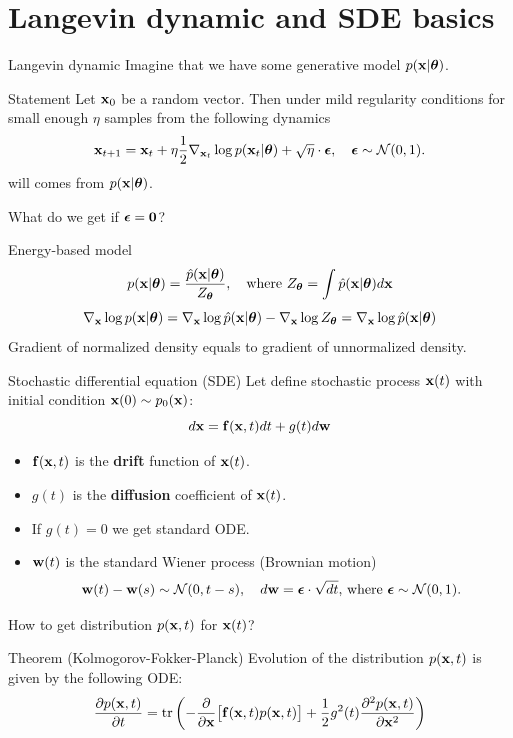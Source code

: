 \section{Langevin dynamic and SDE basics}
\begin{frame}{Langevin dynamic}
	Imagine that we have some generative model $p(\mathbf{x} | \boldsymbol{\theta})$.
	\begin{block}{Statement}
		Let $\mathbf{x}_0$ be a random vector. Then under mild regularity conditions for small enough $\eta$ samples from the following dynamics
		\[
			\mathbf{x}_{t + 1} = \mathbf{x}_t + \eta \frac{1}{2} \nabla_{\mathbf{x}_t} \log p(\mathbf{x}_t | \boldsymbol{\theta}) + \sqrt{\eta} \cdot \boldsymbol{\epsilon}, \quad \boldsymbol{\epsilon} \sim \mathcal{N}(0, 1).
		\]
		will comes from $p(\mathbf{x} | \boldsymbol{\theta})$.
	\end{block}
	What do we get if $\boldsymbol{\epsilon} = \boldsymbol{0}$?
	\begin{block}{Energy-based model}
		\vspace{-0.4cm}
		\[
			p(\mathbf{x} | \boldsymbol{\theta}) = \frac{\hat{p}(\mathbf{x} | \boldsymbol{\theta})}{Z_{\boldsymbol{\theta}}}, \quad \text{where } Z_{\boldsymbol{\theta}} = \int \hat{p}(\mathbf{x} | \boldsymbol{\theta}) d \mathbf{x}
		\]
		\[
			\nabla_{\mathbf{x}} \log p(\mathbf{x} | \boldsymbol{\theta}) = \nabla_{\mathbf{x}} \log \hat{p}(\mathbf{x} | \boldsymbol{\theta}) - \nabla_{\mathbf{x}} \log Z_{\boldsymbol{\theta}} = \nabla_{\mathbf{x}} \log \hat{p}(\mathbf{x} | \boldsymbol{\theta})
		\]
		Gradient of normalized density equals to gradient of unnormalized density.
	\end{block}
\end{frame}
\begin{frame}{Stochastic differential equation (SDE)}
	Let define stochastic process $\mathbf{x}(t)$ with initial condition $\mathbf{x}(0) \sim p_0(\mathbf{x})$:
	\[
		d\mathbf{x} = \mathbf{f}(\mathbf{x}, t) dt + g(t) d \mathbf{w}
	\]
	\vspace{-0.6cm}
	\begin{itemize}
		 \item $\mathbf{f}(\mathbf{x}, t)$ is the \textbf{drift} function of $\mathbf{x}(t)$.
		 \item $g(t)$ is the \textbf{diffusion} coefficient of $\mathbf{x}(t)$.
		 \item If $g(t) = 0$ we get standard ODE.
		 \item $\mathbf{w}(t)$ is the standard Wiener process (Brownian motion)
		 \[		
		 \mathbf{w}(t) - \mathbf{w}(s) \sim \mathcal{N}(0, t - s), \quad d \mathbf{w} = \boldsymbol{\epsilon} \cdot \sqrt{dt}, \, \text{where } \boldsymbol{\epsilon} \sim \mathcal{N}(0, 1).
		 \]
	\end{itemize}
	 How to get distribution $p(\mathbf{x}, t)$ for $\mathbf{x}(t)$?
 	\begin{block}{Theorem (Kolmogorov-Fokker-Planck)}
 		Evolution of the distribution $p(\mathbf{x}, t)$ is given by the following ODE:
 		\vspace{-0.2cm}
 		\[
 			\frac{\partial p(\mathbf{x}, t)}{\partial t} = \text{tr}\left(- \frac{\partial}{\partial \mathbf{x}} \bigl[ \mathbf{f}(\mathbf{x}, t) p(\mathbf{x}, t)\bigr] + \frac{1}{2} g^2(t) \frac{\partial^2 p(\mathbf{x}, t)}{\partial \mathbf{x}^2} \right)
 		\]
 		\vspace{-0.6cm}
 	\end{block}
\end{frame}
